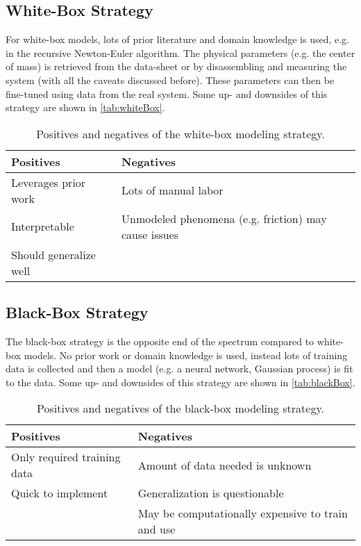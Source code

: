 		\subsection{White-Box Strategy}
			For white-box models, lots of prior literature and domain knowledge is used, e.g. in the recursive Newton-Euler algorithm. The physical parameters (e.g. the center of mass) is retrieved from the data-sheet or by disassembling and measuring the system (with all the caveats discussed before). These parameters can then be fine-tuned using data from the real system. Some up- and downsides of this strategy are shown in \autoref{tab:whiteBox}.

			\begin{table}
				\centering
				\begin{tabular}{l|l}
					\textbf{Positives}     & \textbf{Negatives}                                   \\ \hline
					Leverages prior work   & Lots of manual labor                                 \\
					Interpretable          & Unmodeled phenomena (e.g. friction) may cause issues \\
					Should generalize well &
				\end{tabular}
				\caption{Positives and negatives of the white-box modeling strategy.}
				\label{tab:whiteBox}
			\end{table}

		\subsection{Black-Box Strategy}
			The black-box strategy is the opposite end of the spectrum compared to white-box models. No prior work or domain knowledge is used, instead lots of training data is collected and then a model (e.g. a neural network, Gaussian process) is fit to the data. Some up- and downsides of this strategy are shown in \autoref{tab:blackBox}.

			\begin{table}
				\centering
				\begin{tabular}{l|l}
					\textbf{Positives}          & \textbf{Negatives}                                \\ \hline
					Only required training data & Amount of data needed is unknown                  \\
					Quick to implement          & Generalization is questionable                    \\
					                            & May be computationally expensive to train and use
				\end{tabular}
				\caption{Positives and negatives of the black-box modeling strategy.}
				\label{tab:blackBox}
			\end{table}

